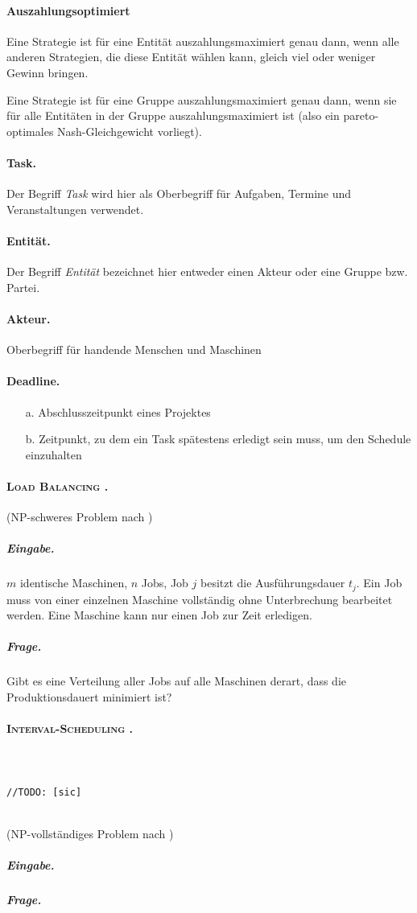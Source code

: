 \documentclass[12pt,twoside]{article}
\theoremstyle{plain}
\theoremstyle{definition}
\theoremstyle{remark}
\newcommand{\ints}{\textsc{Interval-Scheduling} }
\newcommand{\lb}{\textsc{Load Balancing} }
\newcommand{\todo}[1]{
	\addcontentsline{toc}{subsubsection}{TODO: #1}
	\textcolor{pgreen}{\texttt{\-\\ \-\\//TODO: #1\-\\ \-\\}}
}
\begin{document}
\paragraph*{Auszahlungsoptimiert}
	\label{def:st:auszahlung}
	Eine Strategie ist für eine Entität auszahlungsmaximiert genau dann, wenn alle anderen Strategien, die diese Entität wählen kann, gleich viel oder weniger Gewinn bringen.
	
	Eine Strategie ist für eine Gruppe auszahlungsmaximiert genau dann, wenn sie für alle Entitäten in der Gruppe auszahlungsmaximiert ist (also ein pareto-optimales Nash-Gleichgewicht vorliegt).
\paragraph*{Task.}
	Der Begriff \textit{Task} wird hier als Oberbegriff für Aufgaben, Termine und Veranstaltungen verwendet.
\paragraph*{Entität.}
	Der Begriff \textit{Entität} bezeichnet hier entweder einen Akteur oder eine Gruppe bzw. Partei.
\paragraph*{Akteur.}
	Oberbegriff für handende Menschen und Maschinen
\paragraph*{Deadline.}
	\begin{enumerate}
		\item[a.] Abschlusszeitpunkt eines Projektes
		\item[b.] Zeitpunkt, zu dem ein Task spätestens erledigt sein muss, um den Schedule einzuhalten
	\end{enumerate}
\paragraph*{\lb .}
	\label{def:prob:load-balancing}
	(NP-schweres Problem nach \cite{Andreae2016})
		\subparagraph*{Eingabe.}$m$ identische Maschinen, $n$ Jobs, Job $j$ besitzt die Ausführungsdauer $t_j$.
		Ein Job muss von einer einzelnen Maschine vollständig ohne Unterbrechung bearbeitet werden.
		Eine Maschine kann nur einen Job zur Zeit erledigen.
		\subparagraph*{Frage.} Gibt es eine Verteilung aller Jobs auf alle Maschinen derart, dass die Produktionsdauert minimiert ist?
\paragraph*{\ints .}
	\label{def:prob:interval-scheduling}
	\todo{[sic]}
	(NP-vollständiges Problem nach \cite{Andreae2016})
		\subparagraph*{Eingabe.}
		\subparagraph*{Frage.}
\end{document}
